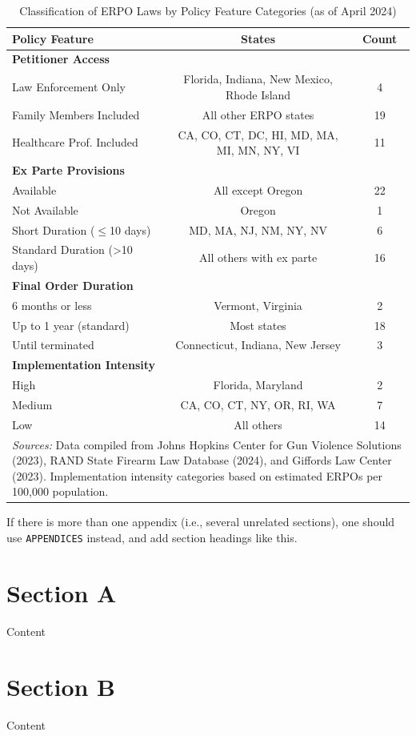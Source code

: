 \documentclass[,ijds,nonblindrev]{informs}
\begin{document}
\begin{APPENDICES}
\begin{table}[ht]
\centering
\caption{Classification of ERPO Laws by Policy Feature Categories (as of April 2024)}
\label{tab:erpo_categories}
\begin{tabular}{lcc}
\toprule
\textbf{Policy Feature} & \textbf{States} & \textbf{Count} \\
\midrule
\textbf{Petitioner Access} & & \\
Law Enforcement Only & Florida, Indiana, New Mexico, Rhode Island & 4 \\
Family Members Included & All other ERPO states & 19 \\
Healthcare Prof. Included & CA, CO, CT, DC, HI, MD, MA, MI, MN, NY, VI & 11 \\
\midrule
\textbf{Ex Parte Provisions} & & \\
Available & All except Oregon & 22 \\
Not Available & Oregon & 1 \\
Short Duration ($\leq$10 days) & MD, MA, NJ, NM, NY, NV & 6 \\
Standard Duration (>10 days) & All others with ex parte & 16 \\
\midrule
\textbf{Final Order Duration} & & \\
6 months or less & Vermont, Virginia & 2 \\
Up to 1 year (standard) & Most states & 18 \\
Until terminated & Connecticut, Indiana, New Jersey & 3 \\
\midrule
\textbf{Implementation Intensity} & & \\
High & Florida, Maryland & 2 \\
Medium & CA, CO, CT, NY, OR, RI, WA & 7 \\
Low & All others & 14 \\
\bottomrule
\multicolumn{3}{p{.95\linewidth}}{\small \textit{Sources:} Data compiled from Johns Hopkins Center for Gun Violence Solutions (2023), RAND State Firearm Law Database (2024), and Giffords Law Center (2023). Implementation intensity categories based on estimated ERPOs per 100,000 population.}
\end{tabular}
\end{table}

If there is more than one appendix (i.e., several unrelated sections),
one should use \texttt{APPENDICES} instead, and add section headings
like this.

\section{Section A}\label{section-a}

Content

\section{Section B}\label{section-b}

Content

\end{APPENDICES}
\end{document}
